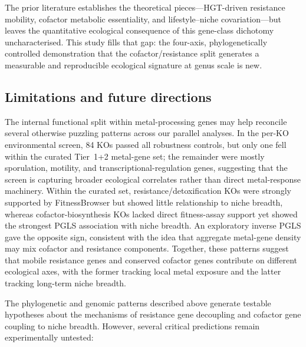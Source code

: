 \documentclass[times]{zHenriquesLab-StyleBioRxiv}
\begin{document}
The prior literature establishes the theoretical pieces---HGT-driven resistance mobility, cofactor metabolic essentiality, and lifestyle--niche covariation---but leaves the quantitative ecological consequence of this gene-class dichotomy uncharacterised. This study fills that gap: the four-axis, phylogenetically controlled demonstration that the cofactor/resistance split generates a measurable and reproducible ecological signature at genus scale is new.




\subsection{Limitations and future directions}
\label{sec:limitations}

The internal functional split within metal-processing genes may help reconcile
several otherwise puzzling patterns across our parallel analyses. In the per-KO
environmental screen, 84 KOs passed all robustness controls, but only one fell
within the curated Tier~1+2 metal-gene set; the remainder were mostly sporulation,
motility, and transcriptional-regulation genes, suggesting that the screen is
capturing broader ecological correlates rather than direct metal-response
machinery. Within the curated set, resistance/detoxification KOs were strongly
supported by FitnessBrowser but showed little relationship to niche breadth,
whereas cofactor-biosynthesis KOs lacked direct fitness-assay support yet showed
the strongest PGLS association with niche breadth. An exploratory inverse PGLS
gave the opposite sign, consistent with the idea that aggregate metal-gene
density may mix cofactor and resistance components. Together, these patterns
suggest that mobile resistance genes and conserved cofactor genes contribute on
different ecological axes, with the former tracking local metal exposure and the
latter tracking long-term niche breadth.



The phylogenetic and genomic patterns described above generate testable hypotheses
about the mechanisms of resistance gene decoupling and cofactor gene coupling to
niche breadth. However, several critical predictions remain experimentally untested:
\end{document}

